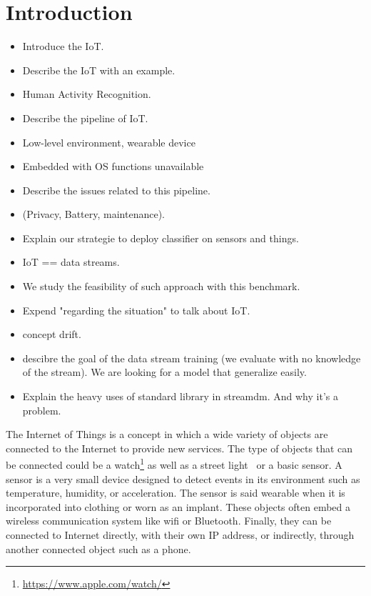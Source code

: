 \section{Introduction}
\label{sec:introduction}

\begin{itemize}
		\item Introduce the IoT.
		\item Describe the IoT with an example.
		\item Human Activity Recognition.
		\item Describe the pipeline of IoT.
		\item Low-level environment, wearable device
		\item Embedded with OS functions unavailable
		\item Describe the issues related to this
				pipeline.
		\item (Privacy, Battery, maintenance).
		\item Explain our strategie to deploy
				classifier on sensors and things.
		\item IoT == data streams.
		\item We study the feasibility of such
				approach with this benchmark.
		\item Expend "regarding the situation" to talk about IoT.
		\item concept drift.
		\item descibre the goal of the data stream
				training (we evaluate with no knowledge of
				the stream). We are looking for a model
				that generalize easily.
		\item Explain the heavy uses of standard
				library in streamdm. And why it's a
				problem.
\end{itemize}
The Internet of
Things is a concept in which a wide variety
of objects are connected to the Internet to
provide new services.  The
type of objects that can be connected could be a
watch\footnote{\url{https://www.apple.com/watch/}}
as well as a street light~\cite{smart-lamp-2011}
or a basic sensor. A sensor is a very small device
designed to detect events in its environment such
as temperature, humidity, or acceleration.  The
sensor is said wearable when it is incorporated
into clothing or worn as an implant. These objects often
embed a wireless communication system like wifi
or Bluetooth.  Finally, they can be
connected to Internet directly, with their own IP
address, or indirectly, through another connected
object such as a phone.

